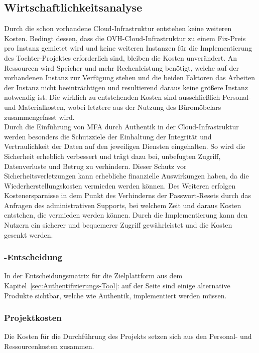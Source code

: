 \subsection{Wirtschaftlichkeitsanalyse}
\label{sec:Wirtschaftlichkeitsanalyse}
Durch die schon vorhandene Cloud-Infrastruktur entstehen keine weiteren Kosten. Bedingt dessen, dass die 
OVH-Cloud-Infrastruktur zu einem Fix-Preis pro Instanz gemietet wird und keine weiteren Instanzen für die Implementierung 
des Tochter-Projektes erforderlich sind, bleiben die Kosten unverändert. An Ressourcen wird Speicher und mehr 
Rechenleistung benötigt, welche auf der vorhandenen Instanz zur Verfügung stehen und die beiden Faktoren das Arbeiten 
der Instanz nicht beeinträchtigen und resultierend daraus keine größere Instanz notwendig ist. Die wirklich zu entstehenden 
Kosten sind ausschließlich Personal- und Materialkosten, wobei letztere aus der Nutzung des Büromöbelars zusammengefasst wird. 
\\Durch die Einführung von \acs{MFA} durch Authentik in der Cloud-Infrastruktur werden besonders die Schutzziele der 
Einhaltung der Integrität und Vertraulichkeit der Daten auf den jeweiligen Diensten eingehalten. So wird die Sicherheit 
erheblich verbessert und trägt dazu bei, unbefugten Zugriff, Datenverluste und Betrug zu verhindern. Dieser Schutz 
vor Sicherheitsverletzungen kann erhebliche finanzielle Auswirkungen haben, da die Wiederherstellungskosten vermieden 
werden können. Des Weiteren erfolgen Kostenersparnisse in dem Punkt des Verhinderns der Passwort-Resets durch das Anfragen des 
administrativen Supports, bei welchem Zeit und daraus Kosten entstehen, die vermieden werden können. Durch die Implementierung 
kann den Nutzern ein sicherer und bequemerer Zugriff gewährleistet und die Kosten gesenkt werden.


\subsubsection{-Entscheidung}
\label{sec:MakeOrBuyEntscheidung}
In der Entscheidungsmatrix für die Zielplattform aus dem Kapitel~\ref{sec:Authentifizierungs-Tool}: 
auf der Seite \pageref{sec:Authentifizierungs-Tool} sind einige alternative Produkte sichtbar, welche wie Authentik, 
implementiert werden müssen.


\subsubsection{Projektkosten}
\label{sec:Projektkosten}
Die Kosten für die Durchführung des Projekts setzen sich aus den Personal- und Ressourcenkosten zusammen.   

